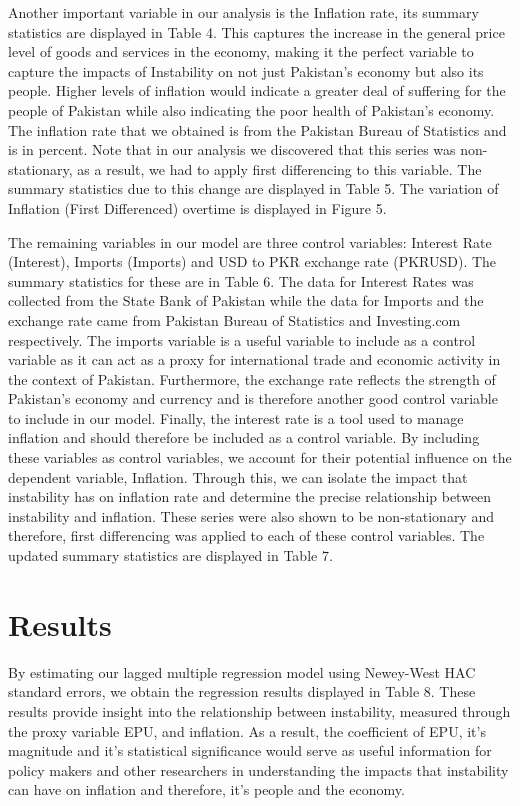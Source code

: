 \documentclass[11pt]{article}
\begin{document}
Another important variable in our analysis is the Inflation rate, its summary statistics are displayed in Table 4. This captures the increase in the general price level of goods and services in the economy, making it the perfect variable to capture the impacts of Instability on not just Pakistan’s economy but also its people. Higher levels of inflation would indicate a greater deal of suffering for the people of Pakistan while also indicating the poor health of Pakistan’s economy. The inflation rate that we obtained is from the Pakistan Bureau of Statistics and is in percent. Note that in our analysis we discovered that this series was non-stationary, as a result, we had to apply first differencing to this variable. The summary statistics due to this change are displayed in Table 5. The variation of Inflation (First Differenced) overtime is displayed in Figure 5. \newline

The remaining variables in our model are three control variables: Interest Rate (Interest), Imports (Imports) and USD to PKR exchange rate (PKRUSD). The summary statistics for these are in Table 6. The data for Interest Rates was collected from the State Bank of Pakistan while the data for Imports and the exchange rate came from Pakistan Bureau of Statistics and Investing.com respectively. The imports variable is a useful variable to include as a control variable as it can act as a proxy for international trade and economic activity in the context of Pakistan. Furthermore, the exchange rate reflects the strength of Pakistan’s economy and currency and is therefore another good control variable to include in our model. Finally, the interest rate is a tool used to manage inflation and should therefore be included as a control variable. By including these variables as control variables, we account for their potential influence on the dependent variable, Inflation. Through this, we can isolate the impact that instability has on inflation rate and determine the precise relationship between instability and inflation. These series were also shown to be non-stationary and therefore, first differencing was applied to each of these control variables. The updated summary statistics are displayed in Table 7.

\section{Results}
By estimating our lagged multiple regression model using Newey-West HAC standard errors, we obtain the regression results displayed in Table 8. These results provide insight into the relationship between instability, measured through the proxy variable EPU, and inflation. As a result, the coefficient of EPU, it’s magnitude and it’s statistical significance would serve as useful information for policy makers and other researchers in understanding the impacts that instability can have on inflation and therefore, it’s people and the economy. \newline
\end{document}
